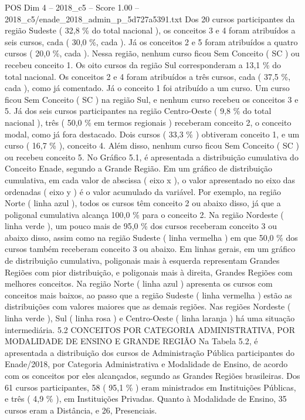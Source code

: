 \begin{textsample}{POS Dim 4 – 2018\_c5 – Score 1.00 – 2018\_c5/enade\_2018\_admin\_p\_5d727a5391.txt}
Dos 20 cursos participantes da região Sudeste ( 32,8 \% do total nacional ), os conceitos 3 e 4 foram atribuídos a seis cursos, cada ( 30,0 \%, cada ).
Já os conceitos 2 e 5 foram atribuídos a quatro cursos ( 20,0 \%, cada ).
Nessa região, nenhum curso ficou Sem Conceito ( SC ) ou recebeu conceito 1.
Os oito cursos da região Sul corresponderam a 13,1 \% do total nacional.
Os conceitos 2 e 4 foram atribuídos a três cursos, cada ( 37,5 \%, cada ), como já comentado.
Já o conceito 1 foi atribuído a um curso.
Um curso ficou Sem Conceito ( SC ) na região Sul, e nenhum curso recebeu os conceitos 3 e 5.
Já dos seis cursos participantes na região Centro-Oeste ( 9,8 \% do total nacional ), três ( 50,0 \% em termos regionais ) receberam conceito 2, o conceito modal, como já fora destacado.
Dois cursos ( 33,3 \% ) obtiveram conceito 1, e um curso ( 16,7 \% ), conceito 4.
Além disso, nenhum curso ficou Sem Conceito ( SC ) ou recebeu conceito 5.
No Gráfico 5.1, é apresentada a distribuição cumulativa do Conceito Enade, segundo a Grande Região.
Em um gráfico de distribuição cumulativa, em cada valor de abscissa ( eixo x ), o valor apresentado no eixo das ordenadas ( eixo y ) é o valor acumulado da variável.
Por exemplo, na região Norte ( linha azul ), todos os cursos têm conceito 2 ou abaixo disso, já que a poligonal cumulativa alcança 100,0 \% para o conceito 2.
Na região Nordeste ( linha verde ), um pouco mais de 95,0 \% dos cursos receberam conceito 3 ou abaixo disso, assim como na região Sudeste ( linha vermelha ) em que 50,0 \% dos cursos também receberam conceito 3 ou abaixo.
Em linhas gerais, em um gráfico de distribuição cumulativa, poligonais mais à esquerda representam Grandes Regiões com pior distribuição, e poligonais mais à direita, Grandes Regiões com melhores conceitos.
Na região Norte ( linha azul ) apresenta os cursos com conceitos mais baixos, ao passo que a região Sudeste ( linha vermelha ) estão as distribuições com valores maiores que as demais regiões.
Nas regiões Nordeste ( linha verde ), Sul ( linha rosa ) e Centro-Oeste ( linha laranja ) há uma situação intermediária. 5.2 CONCEITOS POR CATEGORIA ADMINISTRATIVA, POR MODALIDADE DE ENSINO E GRANDE REGIÃO Na Tabela 5.2, é apresentada a distribuição dos cursos de Administração Pública participantes do Enade/2018, por Categoria Administrativa e Modalidade de Ensino, de acordo com os conceitos por eles alcançados, segundo as Grandes Regiões brasileiras.
Dos 61 cursos participantes, 58 ( 95,1 \% ) eram ministrados em Instituições Públicas, e três ( 4,9 \% ), em Instituições Privadas.
Quanto à Modalidade de Ensino, 35 cursos eram a Distância, e 26, Presenciais.

\end{textsample}
